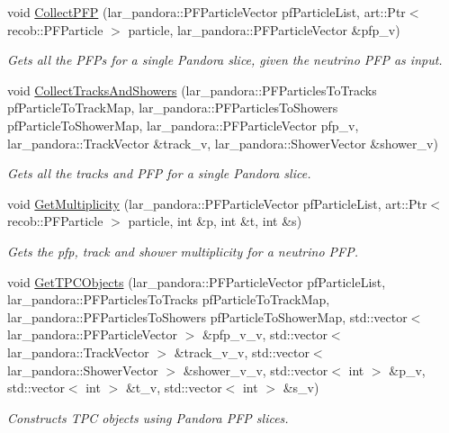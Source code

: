\begin{DoxyCompactItemize}
\item 
void \hyperlink{group__UBXSec_ga9572bb5f180624d28ed9055591d633eb}{\-Collect\-P\-F\-P} (lar\-\_\-pandora\-::\-P\-F\-Particle\-Vector pf\-Particle\-List, art\-::\-Ptr$<$ recob\-::\-P\-F\-Particle $>$ particle, lar\-\_\-pandora\-::\-P\-F\-Particle\-Vector \&pfp\-\_\-v)
\begin{DoxyCompactList}\small\item\em \-Gets all the \-P\-F\-Ps for a single \-Pandora slice, given the neutrino \-P\-F\-P as input. \end{DoxyCompactList}\item 
void \hyperlink{group__UBXSec_ga4742f34e12ae8d756648f606123fe810}{\-Collect\-Tracks\-And\-Showers} (lar\-\_\-pandora\-::\-P\-F\-Particles\-To\-Tracks pf\-Particle\-To\-Track\-Map, lar\-\_\-pandora\-::\-P\-F\-Particles\-To\-Showers pf\-Particle\-To\-Shower\-Map, lar\-\_\-pandora\-::\-P\-F\-Particle\-Vector pfp\-\_\-v, lar\-\_\-pandora\-::\-Track\-Vector \&track\-\_\-v, lar\-\_\-pandora\-::\-Shower\-Vector \&shower\-\_\-v)
\begin{DoxyCompactList}\small\item\em \-Gets all the tracks and \-P\-F\-P for a single \-Pandora slice. \end{DoxyCompactList}\item 
void \hyperlink{group__UBXSec_ga73815b97ad47030b3b73bc623d583fef}{\-Get\-Multiplicity} (lar\-\_\-pandora\-::\-P\-F\-Particle\-Vector pf\-Particle\-List, art\-::\-Ptr$<$ recob\-::\-P\-F\-Particle $>$ particle, int \&p, int \&t, int \&s)
\begin{DoxyCompactList}\small\item\em \-Gets the pfp, track and shower multiplicity for a neutrino \-P\-F\-P. \end{DoxyCompactList}\item 
void \hyperlink{group__UBXSec_gad1aa79fd927be4bebd74bd6537144542}{\-Get\-T\-P\-C\-Objects} (lar\-\_\-pandora\-::\-P\-F\-Particle\-Vector pf\-Particle\-List, lar\-\_\-pandora\-::\-P\-F\-Particles\-To\-Tracks pf\-Particle\-To\-Track\-Map, lar\-\_\-pandora\-::\-P\-F\-Particles\-To\-Showers pf\-Particle\-To\-Shower\-Map, std\-::vector$<$ lar\-\_\-pandora\-::\-P\-F\-Particle\-Vector $>$ \&pfp\-\_\-v\-\_\-v, std\-::vector$<$ lar\-\_\-pandora\-::\-Track\-Vector $>$ \&track\-\_\-v\-\_\-v, std\-::vector$<$ lar\-\_\-pandora\-::\-Shower\-Vector $>$ \&shower\-\_\-v\-\_\-v, std\-::vector$<$ int $>$ \&p\-\_\-v, std\-::vector$<$ int $>$ \&t\-\_\-v, std\-::vector$<$ int $>$ \&s\-\_\-v)
\begin{DoxyCompactList}\small\item\em \-Constructs \-T\-P\-C objects using \-Pandora \-P\-F\-P slices. \end{DoxyCompactList}\item 

\end{DoxyCompactItemize}
